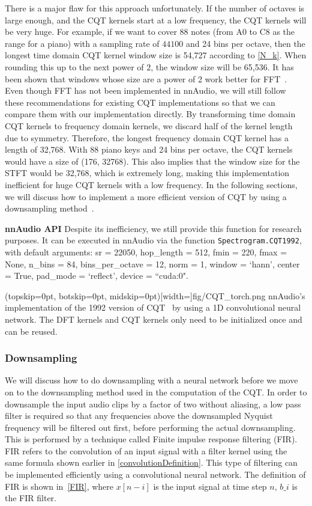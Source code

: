 \documentclass{ieeeaccess}
\newcommand{\nbh}[1]{\texttt{#1}}
\begin{document}
There is a major flaw for this approach unfortunately. If the number of octaves is large enough, and the CQT kernels start at a low frequency, the CQT kernels will be very huge. For example, if we want to cover 88 notes (from A0 to C8 as the range for a piano) with a sampling rate of $44100$ and 24 bins per octave, then the longest time domain CQT kernel window size is 54,727 according to \eqref{N_k}. When rounding this up to the next power of $2$, the window size will be 65,536. It has been shown that windows whose size are a power of 2 work better for FFT~\cite{rabiner1969chirp}.  Even though FFT has not been implemented in nnAudio, we will still follow these recommendations for existing CQT implementations so that we can compare them with our implementation directly. By transforming time domain CQT kernels to frequency domain kernels, we discard half of the kernel length due to symmetry. Therefore, the longest frequency domain CQT kernel has a length of 32,768. With 88 piano keys and 24 bins per octave, the CQT kernels would have a size of (176, 32768). This also implies that the window size for the STFT would be 32,768, which is extremely long, making this implementation inefficient for huge CQT kernels with a low frequency. In the following sections, we will discuss how to implement a more efficient version of CQT by using a downsampling method~\cite{brown1991calculation}.

\hspace{11pt} 

\noindent \textbf{nnAudio API} Despite its inefficiency, we still provide this function for research purposes. It can be executed in nnAudio via the function \nbh{Spectrogram.CQT1992}, with default arguments: sr = 22050, hop\_length = 512, fmin = 220, fmax = None, n\_bins = 84, bins\_per\_octave = 12, norm = 1, window = `hann', center = True, pad\_mode = `reflect', device = ``cuda:0".

\Figure[h](topskip=0pt, botskip=0pt, midskip=0pt)[width=\linewidth]{fig/CQT_torch.png}
{nnAudio's implementation of the 1992 version of CQT~\cite{brown1992efficient} by using a 1D convolutional neural network. The DFT kernels and CQT kernels only need to be initialized once and can be reused. \label{fig: CQT_torch}}


\subsubsection{Downsampling}
We will discuss how to do downsampling with a neural network before we move on to the downsampling method used in the computation of the CQT. In order to downsample the input audio clips by a factor of two without aliasing, a low pass filter is required so that any frequencies above the downsampled Nyquist frequency will be filtered out first, before performing the actual downsampling. This is performed by a technique called Finite impulse response filtering (FIR). FIR refers to the convolution of an input signal with a filter kernel using the same formula shown earlier in \eqref{convolutionDefinition}. This type of filtering can be implemented efficiently using a convolutional neural network.
The definition of FIR is shown in~\eqref{FIR}, where $x[n-i]$ is the input signal at time step $n$, $b\_i$ is the FIR filter. 
\end{document}

